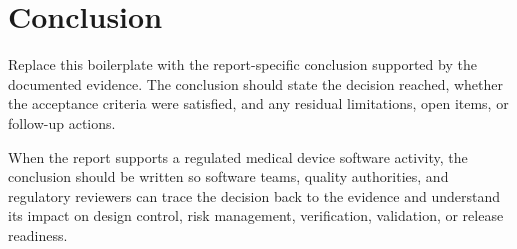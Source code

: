 \section{Conclusion}
Replace this boilerplate with the report-specific conclusion supported by the
documented evidence.  The conclusion should state the decision reached, whether
the acceptance criteria were satisfied, and any residual limitations, open items,
or follow-up actions.

\tlcVspace

When the report supports a regulated medical device software activity, the
conclusion should be written so software teams, quality authorities, and
regulatory reviewers can trace the decision back to the evidence and understand
its impact on design control, risk management, verification, validation, or
release readiness.
